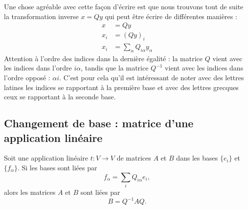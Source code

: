 Une chose agréable avec cette façon d'écrire est que nous trouvons tout de suite la transformation inverse \( x=Qy\) qui peut être écrire de différentes manières :
\begin{subequations}
    \begin{align}
        x&=Qy\\
        x_i&=(Qy)_i   \label{SUBEQooPVGBooDafCcBk}  \\
        x_i&=\sum_{\alpha}Q_{i\alpha}y_{\alpha}
    \end{align}
\end{subequations}
Attention à l'ordre des indices dans la dernière égalité : la matrice \( Q\) vient avec les indices dans l'ordre \( i\alpha\), tandis que la matrice \( Q^{-1}\) vient avec les indices dans l'ordre opposé : \( \alpha i\). C'est pour cela qu'il est intéressant de noter avec des lettres latines les indices se rapportant à la première base et avec des lettres grecques ceux se rapportant à la seconde base.

\subsection{Changement de base : matrice d'une application linéaire}

\begin{proposition}     \label{PROPooNZBEooWyCXTw}
    Soit une application linéaire \( t\colon V\to V\) de matrices \( A\) et \( B\) dans les bases \( \{ e_i \}\) et \( \{ f_{\alpha} \}\). Si les bases sont liées par
    \begin{equation}
        f_{\alpha}=\sum_iQ_{i\alpha}e_i,
    \end{equation}
    alors les matrices \( A\) et \( B\) sont liées par
    \begin{equation}
        B=Q^{-1}AQ.
    \end{equation}
\end{proposition}

